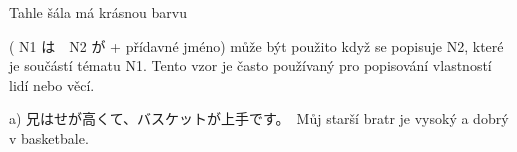 Tahle šála má krásnou barvu
 
 
 
( N1 は　N2 が + přídavné jméno) může být použito když se popisuje N2, které je součástí tématu N1. Tento vzor je často používaný pro popisování vlastností lidí nebo věcí.

a) 兄はせが高くて、バスケットが上手です。　Můj starší bratr je vysoký a dobrý v basketbale. 



















